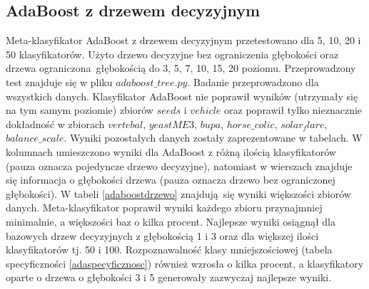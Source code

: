 \subsection{AdaBoost z drzewem decyzyjnym}
Meta-klasyfikator AdaBoost z drzewem decyzyjnym przetestowano dla 5, 10, 20 i 50 klasyfikatorów. Użyto drzewo decyzyjne bez ograniczenia głębokości oraz drzewa ograniczona głębokością do 3, 5, 7, 10, 15, 20 poziomu. Przeprowadzony test znajduje się w pliku $adaboost\_tree.py$. Badanie przeprowadzono dla wszystkich danych. Klasyfikator AdaBoost nie poprawił wyników (utrzymały się na tym samym poziomie) zbiorów $seeds$ i $vehicle$ oraz poprawił tylko nieznacznie dokładność w zbiorach $vertebal$, $yeastME3$, $bupa$, $horse\_colic$, $solar_flare$, $balance\_scale$. Wyniki pozostałych danych zostały zaprezentowane w tabelach. W kolumnach umieszczono wyniki dla AdaBoost z różną ilością klasyfikatorów (pauza oznacza pojedyncze drzewo decyzyjne), natomiast w wierszach znajduje się informacja o głębokości drzewa (pauza oznacza drzewo bez ograniczonej głębokości). W tabeli \ref{adaboostdrzewo} znajdują się wyniki większości zbiorów danych. Meta-klasyfikator poprawił wyniki każdego zbioru przynajmniej minimalnie, a większości baz o kilka procent. Najlepsze wyniki osiągnął dla bazowych drzew decyzyjnych z głębokością 1 i 3 oraz dla większej ilości klasyfikatorów tj. 50 i 100. Rozpoznawalność klasy mniejszościowej (tabela specyficzności \ref{adaspecyficznosc}) również wzrosła o kilka procent, a klasyfikatory oparte o drzewa o głębokości 3 i 5 generowały zazwyczaj najlepsze wyniki.
